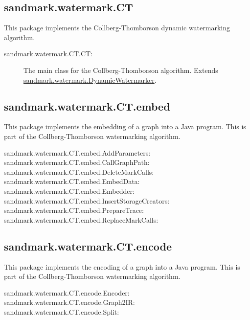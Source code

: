 \subsection{sandmark.watermark.CT}
This package implements the Collberg-Thomborson dynamic
watermarking algorithm.
\begin{description}
   \item[sandmark.watermark.CT.CT:]
      The main class for the Collberg-Thomborson 
      algorithm. Extends \url{sandmark.watermark.DynamicWatermarker}.
\end{description}

\subsection{sandmark.watermark.CT.embed}
This package implements the embedding of a graph
into a Java program. This is part of the 
Collberg-Thomborson watermarking algorithm.
\begin{description}
   \item[sandmark.watermark.CT.embed.AddParameters:]
   \item[sandmark.watermark.CT.embed.CallGraphPath:]
   \item[sandmark.watermark.CT.embed.DeleteMarkCalls:]
   \item[sandmark.watermark.CT.embed.EmbedData:]
   \item[sandmark.watermark.CT.embed.Embedder:]
   \item[sandmark.watermark.CT.embed.InsertStorageCreators:]
   \item[sandmark.watermark.CT.embed.PrepareTrace:]
   \item[sandmark.watermark.CT.embed.ReplaceMarkCalls:]
\end{description}

\subsection{sandmark.watermark.CT.encode}
This package implements the encoding of a graph
into a Java program. This is part of the 
Collberg-Thomborson watermarking algorithm.
\begin{description}
   \item[sandmark.watermark.CT.encode.Encoder:]
   \item[sandmark.watermark.CT.encode.Graph2IR:]
   \item[sandmark.watermark.CT.encode.Split:]
\end{description}

